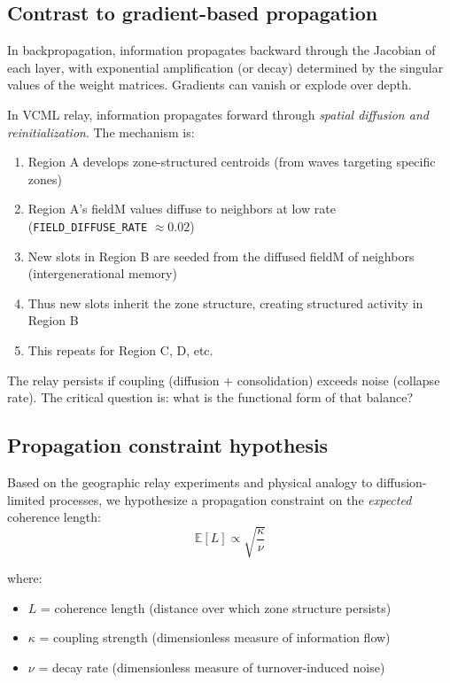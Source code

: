 \documentclass[11pt]{article}
\begin{document}
\subsection{Contrast to gradient-based propagation}

In backpropagation, information propagates backward through the Jacobian of each layer, with exponential amplification (or decay) determined by the singular values of the weight matrices. Gradients can vanish or explode over depth.

In VCML relay, information propagates forward through \emph{spatial diffusion and reinitialization}. The mechanism is:
\begin{enumerate}
  \item Region A develops zone-structured centroids (from waves targeting specific zones)
  \item Region A's fieldM values diffuse to neighbors at low rate (\texttt{FIELD\_DIFFUSE\_RATE} $\approx 0.02$)
  \item New slots in Region B are seeded from the diffused fieldM of neighbors (intergenerational memory)
  \item Thus new slots inherit the zone structure, creating structured activity in Region B
  \item This repeats for Region C, D, etc.
\end{enumerate}

The relay persists if coupling (diffusion + consolidation) exceeds noise (collapse rate). The critical question is: what is the functional form of that balance?

\subsection{Propagation constraint hypothesis}

Based on the geographic relay experiments and physical analogy to diffusion-limited processes, we hypothesize a propagation constraint on the \emph{expected} coherence length:
\[
  \mathbb{E}[L] \propto \sqrt{\frac{\kappa}{\nu}}
\]

where:
\begin{itemize}
  \item $L$ = coherence length (distance over which zone structure persists)
  \item $\kappa$ = coupling strength (dimensionless measure of information flow)
  \item $\nu$ = decay rate (dimensionless measure of turnover-induced noise)
\end{itemize}
\end{document}
